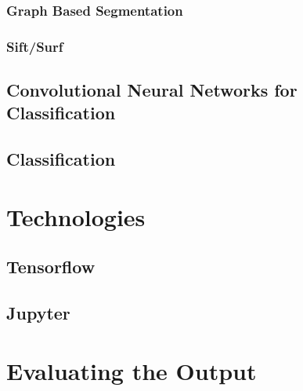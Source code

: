 \subsubsection{Graph Based Segmentation}
\subsubsection{Sift/Surf}
\subsection{Convolutional Neural Networks for Classification}

\subsection{Classification}

\section{Technologies}
\subsection{Tensorflow}
\subsection{Jupyter}

\section{Evaluating the Output}


